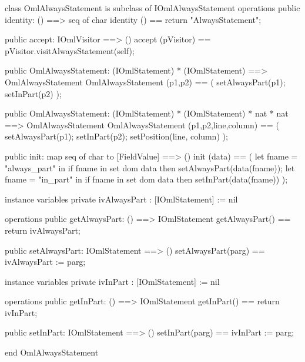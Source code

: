 \begin{vdm_al}
class OmlAlwaysStatement is subclass of IOmlAlwaysStatement
operations
  public identity: () ==> seq of char
  identity () == return "AlwaysStatement";

  public accept: IOmlVisitor ==> ()
  accept (pVisitor) == pVisitor.visitAlwaysStatement(self);

  public OmlAlwaysStatement:
    (IOmlStatement) *
    (IOmlStatement) ==> OmlAlwaysStatement
  OmlAlwaysStatement (p1,p2) == 
    ( setAlwaysPart(p1);
      setInPart(p2) );

  public OmlAlwaysStatement:
    (IOmlStatement) *
    (IOmlStatement) *
    nat *
    nat ==> OmlAlwaysStatement
  OmlAlwaysStatement (p1,p2,line,column) == 
    ( setAlwaysPart(p1);
      setInPart(p2);
      setPosition(line, column) );

  public init: map seq of char to [FieldValue] ==> ()
  init (data) ==
    ( let fname = "always_part" in
        if fname in set dom data
        then setAlwaysPart(data(fname));
      let fname = "in_part" in
        if fname in set dom data
        then setInPart(data(fname)) );

instance variables
  private ivAlwaysPart : [IOmlStatement] := nil

operations
  public getAlwaysPart: () ==> IOmlStatement
  getAlwaysPart() == return ivAlwaysPart;

  public setAlwaysPart: IOmlStatement ==> ()
  setAlwaysPart(parg) == ivAlwaysPart := parg;

instance variables
  private ivInPart : [IOmlStatement] := nil

operations
  public getInPart: () ==> IOmlStatement
  getInPart() == return ivInPart;

  public setInPart: IOmlStatement ==> ()
  setInPart(parg) == ivInPart := parg;

end OmlAlwaysStatement
\end{vdm_al}

